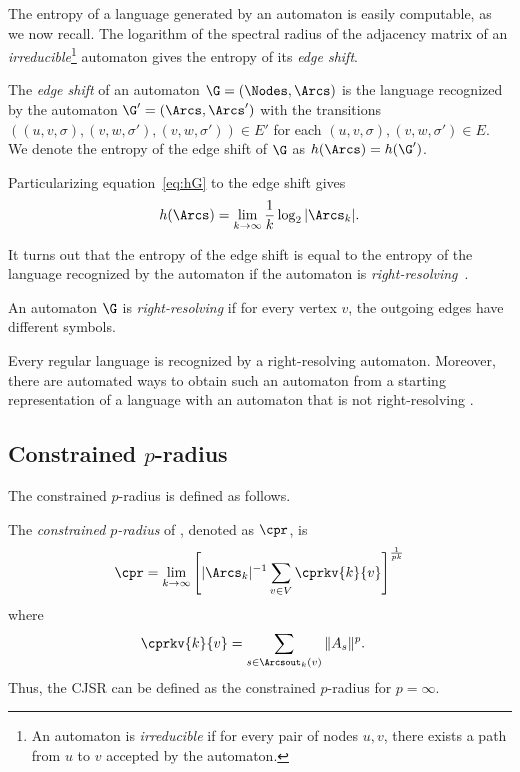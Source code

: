\documentclass[11pt,twoside,a4paper,openright]{uclouvain-thesis}
\begin{document}
The entropy of a language generated by an automaton is easily computable, as we now recall.
The logarithm of the spectral radius of the adjacency matrix of an \emph{irreducible}\footnote{An automaton is \emph{irreducible} if for every pair of nodes $u, v$, there exists a path from $u$ to $v$ accepted by the automaton.} automaton gives the entropy of its \emph{edge shift}.

\begin{mydef}
  \label{def:edgeshift}
  The \emph{edge shift} of an automaton $\G = (\Nodes, \Arcs)$ is the language
  recognized by the automaton $\G' = (\Arcs, \Arcs')$ with the transitions
	$((u,v,\sigma),(v,w,\sigma'),(v,w,\sigma')) \in E'$ for each $(u,v,\sigma), (v,w,\sigma') \in E$.
  We denote the entropy of the edge shift of $\G$ as $h(\Arcs) = h(\G')$.
\end{mydef}

Particularizing equation~\eqref{eq:hG} to the edge shift gives
\begin{equation}
  \label{eq:hE}
  h(\Arcs) = \lim_{k \to \infty} \frac{1}{k} \log_2|\Arcs_k|.
\end{equation}



It turns out that the entropy of the edge shift is equal to the entropy of the language recognized by the automaton if the automaton is \emph{right-resolving}~\cite[Proposition~4.1.13]{lind1995introduction}.

\begin{mydef}
  An automaton $\G$ is \emph{right-resolving} if for every vertex $v$, the outgoing edges have different symbols.
\end{mydef}

Every regular language is recognized by a right-resolving automaton.
Moreover, there are automated ways to obtain such an automaton from a starting representation of a language with an automaton that is not right-resolving \cite[Section~3.3]{lind1995introduction}.



\subsection{Constrained $p$-radius}
The constrained $p$-radius is defined as follows.
\begin{mydef}
  The \emph{constrained $p$-radius} of
  , denoted as $\cpr$,
  is
  \begin{equation*}
    \cpr =
    \lim_{k \to \infty} \left[|\Arcs_k|^{-1} \sum_{v \in V} \cprkv{k}{v}\right]^{\frac{1}{pk}}
  \end{equation*}
  where
  \begin{align*}
    \cprkv{k}{v} & =
    \sum_{s \in \Arcsout_k(v)} \|A_s\|^p.
  \end{align*}
  Thus, the CJSR can be defined as the constrained $p$-radius for $p = \infty$.
\end{mydef}
\end{document}
